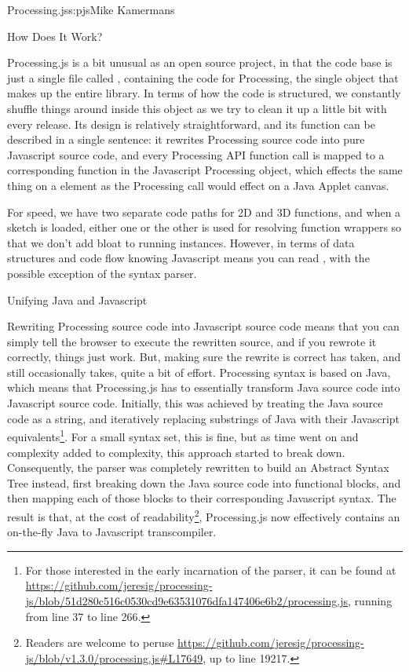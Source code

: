 \begin{aosachapter}{Processing.js}{s:pjs}{Mike Kamermans}
\begin{aosasect1}{How Does It Work?}

Processing.js is a bit unusual as an open source project, in that the
code base is just a single file called ,
containing the code for Processing, the single object that makes up
the entire library. In terms of how the code is structured, we
constantly shuffle things around inside this object as we try to clean
it up a little bit with every release. Its design is relatively
straightforward, and its function can be described in a single
sentence: it rewrites Processing source code into pure Javascript
source code, and every Processing API function call is mapped to a
corresponding function in the Javascript Processing object, which
effects the same thing on a 
element as the Processing call would effect on a Java Applet canvas.

For speed, we have two separate code paths for 2D and 3D functions,
and when a sketch is loaded, either one or the other is used for
resolving function wrappers so that we don't add bloat to running
instances. However, in terms of data structures and code flow knowing
Javascript means you can read , with the possible
exception of the syntax parser.

\begin{aosasect2}{Unifying Java and Javascript}

Rewriting Processing source code into Javascript source code means
that you can simply tell the browser to execute the rewritten source,
and if you rewrote it correctly, things just work. But, making sure
the rewrite is correct has taken, and still occasionally takes, quite
a bit of effort. Processing syntax is based on Java, which means that
Processing.js has to essentially transform Java source code into
Javascript source code. Initially, this was achieved by treating the
Java source code as a string, and iteratively replacing substrings of
Java with their Javascript equivalents\footnote{For those interested
  in the early incarnation of the parser, it can be found at
  \url{https://github.com/jeresig/processing-js/blob/51d280c516c0530cd9e63531076dfa147406e6b2/processing.js},
  running from line 37 to line 266.}. For a small syntax set, this is
fine, but as time went on and complexity added to complexity, this
approach started to break down. Consequently, the parser was
completely rewritten to build an Abstract Syntax Tree instead, first
breaking down the Java source code into functional blocks, and then
mapping each of those blocks to their corresponding Javascript
syntax. The result is that, at the cost of
readability\footnote{Readers are welcome to peruse
  \url{https://github.com/jeresig/processing-js/blob/v1.3.0/processing.js\#L17649},
  up to line 19217.}, Processing.js now effectively contains an
on-the-fly Java to Javascript transcompiler.


\end{aosasect2}
\end{aosasect1}
\end{aosachapter}
